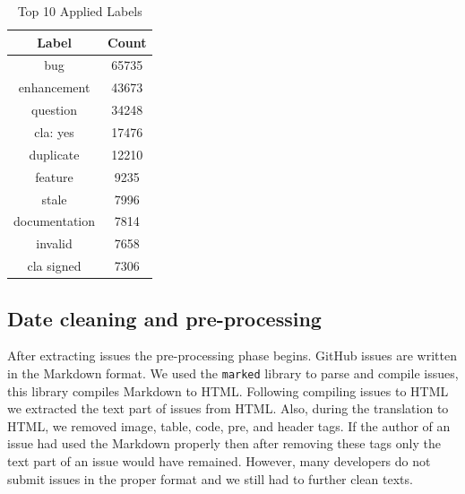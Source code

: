 \documentclass[conference]{IEEEtran}
\begin{document}
\begin{table}[t]
  \caption{Top 10 Applied Labels}
  \begin{center}
  \begin{tabular}{|c|c|}
  \hline
  \textbf{Label} & \textbf{Count}\\
  \hline
  bug           & 65735 \\
  \hline
  enhancement   & 43673 \\
  \hline
  question      & 34248 \\
  \hline
  cla: yes      & 17476 \\
  \hline
  duplicate     & 12210 \\
  \hline
  feature       & 9235 \\
  \hline
  stale         & 7996 \\
  \hline
  documentation & 7814 \\
  \hline
  invalid       & 7658 \\
  \hline
  cla signed    & 7306 \\
  \hline
  \end{tabular}
  \end{center}
  \label{tab:labels}
\end{table}

\subsection{Date cleaning and pre-processing}
After extracting issues the pre-processing phase begins. GitHub issues are written in the Markdown format.
We used the \verb|marked| \cite{web:marked} library to parse and compile issues, this library compiles
Markdown to HTML. Following compiling issues to HTML we extracted the text part of issues from HTML.
Also, during the translation to HTML, we removed image, table, code, pre, and header tags. If the
author of an issue had used the Markdown properly then after removing these tags only the text part
of an issue would have remained. However, many developers do not submit issues in the proper format and we
still had to further clean texts. 
\end{document}
